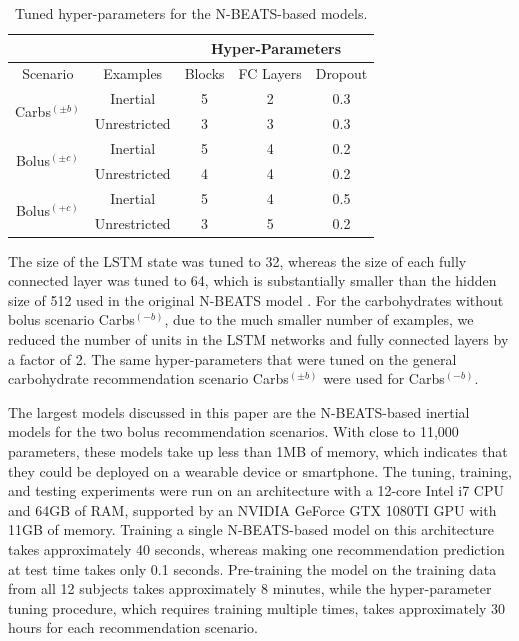 \documentclass[journal,article,submit,moreauthors,pdftex]{Definitions/mdpi}
\begin{document}
\begin{table}[ht]
\caption{Tuned hyper-parameters for the N-BEATS-based models.}
\label{tab:hyper-nbeats}
\begin{center}
\begin{tabular}{|c|c|c|c|c|}
\cline{3-5}
\multicolumn{2}{l}{} & \multicolumn{3}{|c|}{Hyper-Parameters}\\
\hline
Scenario & Examples & Blocks & FC Layers & Dropout\\
\hline
\multirow{2}{*}{Carbs$^{(\pm b)}$} & Inertial & 5 & 2 & 0.3\\
& Unrestricted & 3 & 3 & 0.3\\
\hline
\multirow{2}{*}{Bolus$^{(\pm c)}$} & Inertial & 5 & 4 & 0.2\\
& Unrestricted & 4 & 4 & 0.2\\
\hline
\multirow{2}{*}{Bolus$^{(+c)}$} & Inertial & 5 & 4 & 0.5\\
& Unrestricted & 3 & 5 & 0.2\\
\hline
\end{tabular}
\end{center}
\end{table}


The size of the LSTM state was tuned to 32, whereas the size of each fully connected layer was tuned to 64, which is substantially smaller than the hidden size of 512 used in the original N-BEATS model \cite{oreshkin:nbeats}. For the carbohydrates without bolus scenario Carbs$^{(-b)}$, due to the much smaller number of examples, we reduced the number of units in the LSTM networks and fully connected layers by a factor of 2. The same hyper-parameters that were tuned on the general carbohydrate recommendation scenario Carbs$^{(\pm b)}$ were used for Carbs$^{(-b)}$.

The largest models discussed in this paper are the N-BEATS-based inertial models for the two bolus recommendation scenarios. With close to 11,000 parameters, these models take up less than 1MB of memory, which indicates that they could be deployed on a wearable device or smartphone. The tuning, training, and testing experiments were run on an architecture with a 12-core Intel i7 CPU and 64GB of RAM, supported by an NVIDIA GeForce GTX 1080TI GPU with 11GB of memory. Training a single N-BEATS-based model on this architecture takes approximately 40 seconds, whereas making one recommendation prediction at test time takes only 0.1 seconds. Pre-training the model on the  training data from all 12 subjects takes approximately 8 minutes, while the hyper-parameter tuning procedure, which requires training multiple times, takes approximately 30 hours for each recommendation scenario.
\end{document}
